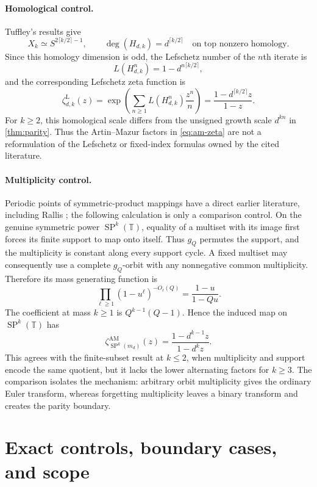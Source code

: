 \documentclass[11pt,a4paper]{amsart}
\theoremstyle{definition}
\theoremstyle{remark}
\newcommand{\T}{\mathbb T}
\newcommand{\AM}{\mathrm{AM}}
\newcommand{\Lef}{\mathrm{L}}
\begin{document}
\paragraph{Homological control.}
Tuffley's results \cite{Tuffley2002} give
\[
 X_k\simeq S^{2\lceil k/2\rceil-1},
 \qquad
 \deg(H_{d,k})=d^{\lceil k/2\rceil}
 \quad\text{on top nonzero homology}.
\]
Since this homology dimension is odd, the Lefschetz number of the $n$th
iterate is
\[
 L(H_{d,k}^n)=1-d^{n\lceil k/2\rceil},
\]
and the corresponding Lefschetz zeta function is
\[
 \zeta^{\Lef}_{d,k}(z)
 =\exp\!\left(\sum_{n\geq1}L(H_{d,k}^n)\frac{z^n}{n}\right)
 =\frac{1-d^{\lceil k/2\rceil}z}{1-z}.
\]
For $k\geq2$, this homological scale differs from the unsigned growth scale
$d^{kn}$ in \cref{thm:parity}.  Thus the Artin--Mazur factors in
\eqref{eq:am-zeta} are not a reformulation of the Lefschetz or fixed-index
formulas owned by the cited literature.

\paragraph{Multiplicity control.}
Periodic points of symmetric-product mappings have a direct earlier
literature, including Rallis \cite{Rallis1983}; the following calculation is
only a comparison control.
On the genuine symmetric power $\operatorname{SP}^k(\T)$, equality of a
multiset with its image first forces its finite support to map onto itself.
Thus $g_Q$ permutes the support, and the multiplicity is constant along every
support cycle.  A fixed multiset may consequently use a complete $g_Q$-orbit
with any nonnegative common multiplicity.
Therefore its mass generating function is
\[
 \prod_{\ell\geq1}(1-u^\ell)^{-O_\ell(Q)}
 =\frac{1-u}{1-Qu}.
\]
The coefficient at mass $k\geq1$ is $Q^{k-1}(Q-1)$.  Hence the induced map
on $\operatorname{SP}^k(\T)$ has
\[
 \zeta^{\AM}_{\operatorname{SP}^k(m_d)}(z)
 =\frac{1-d^{k-1}z}{1-d^kz}.
\]
This agrees with the finite-subset result at $k\leq2$, when multiplicity and
support encode the same quotient, but it lacks the lower alternating factors
for $k\geq3$.  The comparison isolates the mechanism: arbitrary orbit
multiplicity gives the ordinary Euler transform, whereas forgetting
multiplicity leaves a binary transform and creates the parity boundary.

\section{Exact controls, boundary cases, and scope}
\end{document}
